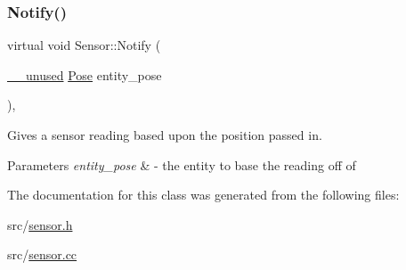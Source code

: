 \subsubsection{\texorpdfstring{Notify()}{Notify()}}
{\footnotesize\ttfamily virtual void Sensor\+::\+Notify (\begin{DoxyParamCaption}\item[{\mbox{\hyperlink{common_8h_a2e3484535ee610c8e19e9859563abe48}{\+\_\+\+\_\+unused}} \mbox{\hyperlink{struct_pose}{Pose}}}]{entity\+\_\+pose }\end{DoxyParamCaption})\hspace{0.3cm}{\ttfamily [inline]}, {\ttfamily [virtual]}}



Gives a sensor reading based upon the position passed in. 


\begin{DoxyParams}{Parameters}
{\em entity\+\_\+pose} & -\/ the entity to base the reading off of \\
\hline
\end{DoxyParams}


The documentation for this class was generated from the following files\+:\begin{DoxyCompactItemize}
\item 
src/\mbox{\hyperlink{sensor_8h}{sensor.\+h}}\item 
src/\mbox{\hyperlink{sensor_8cc}{sensor.\+cc}}\end{DoxyCompactItemize}
